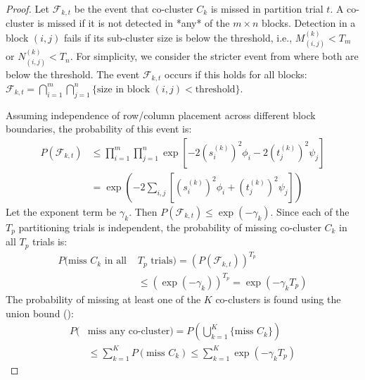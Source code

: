 \documentclass[journal]{IEEEtran}
\theoremstyle{definition}
\theoremstyle{remark} %
\begin{document}
{\color{blue}
\begin{proof}
    Let $\mathcal{F}_{k,t}$ be the event that co-cluster $C_k$ is missed in partition trial $t$. A co-cluster is missed if it is not detected in *any* of the $m \times n$ blocks. Detection in a block $(i,j)$ fails if its sub-cluster size is below the threshold, i.e., $M_{(i,j)}^{(k)} < T_m$ or $N_{(i,j)}^{(k)} < T_n$. For simplicity, we consider the stricter event from  where both are below the threshold. The event $\mathcal{F}_{k,t}$ occurs if this holds for all blocks: $\mathcal{F}_{k,t} = \bigcap_{i=1}^m \bigcap_{j=1}^n \{\text{size in block }(i,j) < \text{threshold}\}$.

    Assuming independence of row/column placement across different block boundaries, the probability of this event is:
    \begin{equation}
        \begin{aligned}
            P(\mathcal{F}_{k,t}) &\le \prod_{i=1}^m \prod_{j=1}^n \exp\left[-2 (s_i^{(k)})^2 \phi_i -2 (t_j^{(k)})^2 \psi_j\right] \\
            &= \exp\left( -2 \sum_{i,j} \left[ (s_i^{(k)})^2 \phi_i + (t_j^{(k)})^2 \psi_j \right] \right)
        \end{aligned}
    \end{equation}
    Let the exponent term be $\gamma_k$. Then $P(\mathcal{F}_{k,t}) \le \exp(-\gamma_k)$. Since each of the $T_p$ partitioning trials is independent, the probability of missing co-cluster $C_k$ in all $T_p$ trials is:
    \begin{equation}
        \begin{aligned}
            P(\text{miss } C_k \text{ in all } & T_p \text{ trials}) = (P(\mathcal{F}_{k,t}))^{T_p} \\
            &\le (\exp(-\gamma_k))^{T_p} = \exp(-\gamma_k T_p)
        \end{aligned}
    \end{equation}
    The probability of missing at least one of the $K$ co-clusters is found using the union bound ():
    \begin{equation}
        \begin{aligned}
            P(&\text{miss any co-cluster}) = P\left(\bigcup_{k=1}^K \{\text{miss } C_k\}\right) \\
            &\le \sum_{k=1}^K P(\text{miss } C_k) \le \sum_{k=1}^K \exp(-\gamma_k T_p)
        \end{aligned}
    \end{equation}

\end{proof}}
\end{document}
